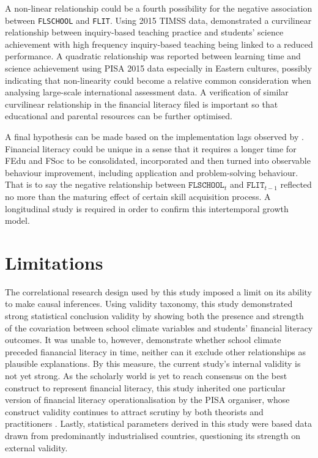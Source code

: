 \documentclass[a4paper,11pt,UKenglish,twoside,openright]{report}\usepackage[]{graphicx}\usepackage[]{color}
\begin{document}
A non-linear relationship could be a fourth possibility for the negative association between \texttt{FLSCHOOL} and \texttt{FLIT}. Using 2015 TIMSS data, \textcite{teig:2018} demonstrated a curvilinear relationship between inquiry-based teaching practice and students' science achievement with high frequency inquiry-based teaching being linked to a reduced performance. A quadratic relationship was reported between learning time and science achievement using PISA 2015 data \parencite{zhang:2021} especially in Eastern cultures, possibly indicating that non-linearity could become a relative common consideration when analysing large-scale international assessment data. A verification of similar curvilinear relationship in the financial literacy filed is important so that educational and parental resources can be further optimised.

A final hypothesis can be made based on the implementation lags observed by \textcite{bernheim:2001}. Financial literacy could be unique in a sense that it requires a longer time for FEdu and FSoc to be consolidated, incorporated and then turned into observable behaviour improvement, including application and problem-solving behaviour. That is to say the negative relationship between $\texttt{FLSCHOOL}_t$ and $\texttt{FLIT}_{t-1}$ reflected no more than the maturing effect of certain skill acquisition process. A longitudinal study is required in order to confirm this intertemporal growth model.

\section{Limitations}

The correlational research design used by this study imposed a limit on its ability to make causal inferences. Using  validity taxonomy, this study demonstrated strong statistical conclusion validity by showing both the presence and strength of the covariation between school climate variables and students' financial literacy outcomes. It was unable to, however, demonstrate whether school climate preceded fianancial literacy in time, neither can it exclude other relationships as plausible explanations. By this measure, the current study's internal validity is not yet strong. As the scholarly world is yet to reach consensus on the best construct to represent financial literacy, this study inherited one particular version of financial literacy operationalisation by the PISA organiser, whose construct validity continues to attract scrutiny by both theorists and practitioners \parencite{schuhen:2014}. Lastly, statistical parameters derived in this study were based data drawn from predominantly industrialised countries, questioning its strength on external validity.
\end{document}
